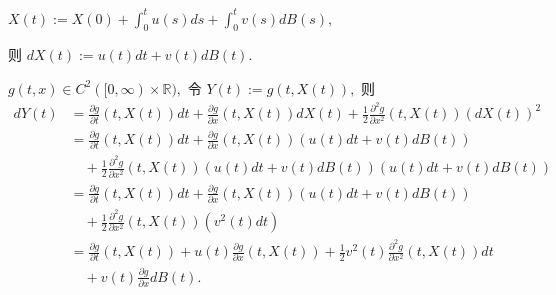 \documentclass[lang=cn,10pt,thmcnt=section]{elegantbook}
\begin{document}
\begin{remark}

	$X(t) := X(0) + \int_0^t u(s) ds + \int_0^t v(s) dB(s),$

则 \( dX(t) := u(t) dt + v(t) dB(t) \).

\(g(t, x) \in C^2([0, \infty) \times \mathbb{R}), \) 令 \( Y(t) := g(t, X(t)), \) 则
\begin{align*}
dY(t) &= \frac{\partial g}{\partial t}(t, X(t)) dt + \frac{\partial g}{\partial x}(t, X(t)) dX(t) + \frac{1}{2} \frac{\partial^2 g}{\partial x^2}(t, X(t)) (dX(t))^2 \\
&= \frac{\partial g}{\partial t}(t, X(t)) dt + \frac{\partial g}{\partial x}(t, X(t)) (u(t) dt + v(t) dB(t)) \\
&\quad + \frac{1}{2} \frac{\partial^2 g}{\partial x^2}(t, X(t)) (u(t) dt + v(t) dB(t))(u(t) dt + v(t) dB(t)) \\
&= \frac{\partial g}{\partial t}(t, X(t)) dt + \frac{\partial g}{\partial x}(t, X(t)) (u(t) dt + v(t) dB(t)) \\
&\quad + \frac{1}{2} \frac{\partial^2 g}{\partial x^2}(t, X(t)) (v^2(t) dt)\\
&= \frac{\partial g}{\partial t}(t, X(t)) + u(t) \frac{\partial g}{\partial x}(t, X(t)) + \frac{1}{2} v^2(t) \frac{\partial^2 g}{\partial x^2}(t, X(t)) dt \\
&\quad + v(t) \frac{\partial g}{\partial x} dB(t).
\end{align*}
\end{remark}
\end{document}

